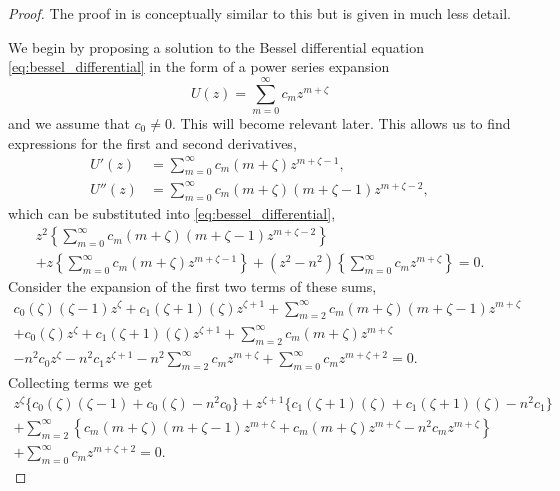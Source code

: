 \begin{proof} The proof in \parencite{korenev02bessel_func} is conceptually similar to this but is given in much less detail.\par
  We begin by proposing a solution to the Bessel differential equation \eqref{eq:bessel_differential} in the form of a power series expansion
    \begin{equation*}
      U(z) = \sum_{m=0}^\infty c_m z^{m + \zeta}
    \end{equation*}
  and we assume that $c_0 \neq 0$. This will become relevant later. This allows us to find expressions for the first and second derivatives,
    \begin{align*}
      U'(z) &= \sum_{m=0}^\infty c_m (m+\zeta) z^{m+\zeta-1}, \\
      U''(z) &= \sum_{m=0}^\infty c_m (m+\zeta)(m+\zeta-1) z^{m+\zeta-2},
    \end{align*}
  which can be substituted into \eqref{eq:bessel_differential},
    \begin{multline}\label{eq:bessel_proof_summation}
      z^2 \left\{ \sum_{m=0}^\infty c_m (m+\zeta)(m+\zeta-1) z^{m+\zeta-2}\right\} \\
        + z \left\{ \sum_{m=0}^\infty c_m (m+\zeta) z^{m+\zeta-1} \right\}
          + (z^2 - n^2) \left\{ \sum_{m=0}^\infty c_m z^{m + \zeta} \right\} = 0.
    \end{multline}
  Consider the expansion of the first two terms of these sums,
    \begin{multline*}
      c_0(\zeta)(\zeta-1)z^{\zeta} + c_1(\zeta+1)(\zeta)z^{\zeta+1} + \sum_{m=2}^\infty c_m (m+\zeta)(m+\zeta-1) z^{m+\zeta} \\
      + c_0(\zeta)z^{\zeta} + c_1(\zeta+1)(\zeta)z^{\zeta+1} + \sum_{m=2}^\infty c_m (m+\zeta) z^{m+\zeta} \\
      - n^2 c_0 z^{\zeta} - n^2 c_1 z^{\zeta+1} -n^2 \sum_{m=2}^\infty c_m z^{m + \zeta} + \sum_{m=0}^\infty c_m z^{m + \zeta+2} =0.
    \end{multline*}
  Collecting terms we get
    \begin{multline*}
      z^{\zeta} \{ c_0(\zeta)(\zeta-1) +  c_0(\zeta) - n^2 c_0 \}
      + z^{\zeta+1} \{  c_1(\zeta+1)(\zeta) + c_1(\zeta+1)(\zeta) - n^2 c_1\} \\
      + \sum_{m=2}^\infty \left\{ c_m (m+\zeta)(m+\zeta-1) z^{m+\zeta} + c_m (m+\zeta) z^{m+\zeta} - n^2 c_m z^{m + \zeta} \right\} \\
      + \sum_{m=0}^\infty c_m z^{m + \zeta+2} =0.
    \end{multline*}

\end{proof}
